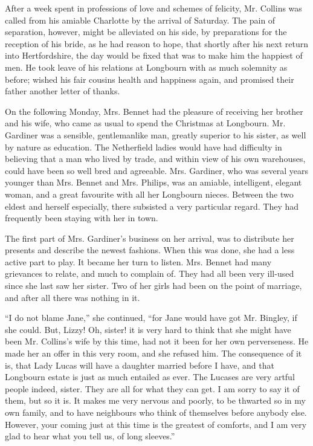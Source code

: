 
After a week spent in professions of love and schemes
of felicity, Mr. Collins was called from his amiable Charlotte
by the arrival of Saturday. The pain of separation,
however, might be alleviated on his side, by preparations
for the reception of his bride, as he had reason to hope,
that shortly after his next return into Hertfordshire, the
day would be fixed that was to make him the happiest
of men. He took leave of his relations at Longbourn
with as much solemnity as before; wished his fair cousins
health and happiness again, and promised their father
another letter of thanks.

On the following Monday, Mrs. Bennet had the pleasure
of receiving her brother and his wife, who came as usual
to spend the Christmas at Longbourn. Mr. Gardiner was
a sensible, gentlemanlike man, greatly superior to his
sister, as well by nature as education. The Netherfield
ladies would have had difficulty in believing that a man
who lived by trade, and within view of his own warehouses,
could have been so well bred and agreeable. Mrs. Gardiner,
who was several years younger than Mrs. Bennet and
Mrs. Philips, was an amiable, intelligent, elegant woman,
and a great favourite with all her Longbourn nieces.
Between the two eldest and herself especially, there subsisted
a very particular regard. They had frequently
been staying with her in town.

The first part of Mrs. Gardiner’s business on her arrival,
was to distribute her presents and describe the newest
fashions. When this was done, she had a less active part
to play. It became her turn to listen. Mrs. Bennet had
many grievances to relate, and much to complain of.
They had all been very ill-used since she last saw her
sister. Two of her girls had been on the point of marriage,
and after all there was nothing in it.

“I do not blame Jane,” she continued, “for Jane
would have got Mr. Bingley, if she could. But, Lizzy!
Oh, sister! it is very hard to think that she might have
been Mr. Collins’s wife by this time, had not it been for
her own perverseness. He made her an offer in this very
room, and she refused him. The consequence of it is,
that Lady Lucas will have a daughter married before I
have, and that Longbourn estate is just as much entailed
as ever. The Lucases are very artful people indeed, sister.
They are all for what they can get. I am sorry to say
it of them, but so it is. It makes me very nervous and
poorly, to be thwarted so in my own family, and to have
neighbours who think of themselves before anybody else.
However, your coming just at this time is the greatest
of comforts, and I am very glad to hear what you tell
us, of long sleeves.”

